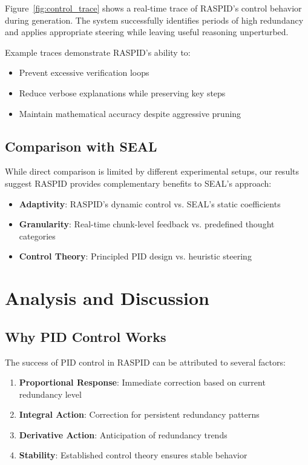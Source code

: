 \documentclass{article}
\begin{document}
Figure~\ref{fig:control_trace} shows a real-time trace of RASPID's control behavior during generation. The system successfully identifies periods of high redundancy and applies appropriate steering while leaving useful reasoning unperturbed.

Example traces demonstrate RASPID's ability to:
\begin{itemize}
\item Prevent excessive verification loops
\item Reduce verbose explanations while preserving key steps
\item Maintain mathematical accuracy despite aggressive pruning
\end{itemize}

\subsection{Comparison with SEAL}

While direct comparison is limited by different experimental setups, our results suggest RASPID provides complementary benefits to SEAL's approach:

\begin{itemize}
\item \textbf{Adaptivity}: RASPID's dynamic control vs. SEAL's static coefficients
\item \textbf{Granularity}: Real-time chunk-level feedback vs. predefined thought categories
\item \textbf{Control Theory}: Principled PID design vs. heuristic steering
\end{itemize}

\section{Analysis and Discussion}

\subsection{Why PID Control Works}

The success of PID control in RASPID can be attributed to several factors:

\begin{enumerate}
\item \textbf{Proportional Response}: Immediate correction based on current redundancy level
\item \textbf{Integral Action}: Correction for persistent redundancy patterns
\item \textbf{Derivative Action}: Anticipation of redundancy trends
\item \textbf{Stability}: Established control theory ensures stable behavior
\end{enumerate}
\end{document}

